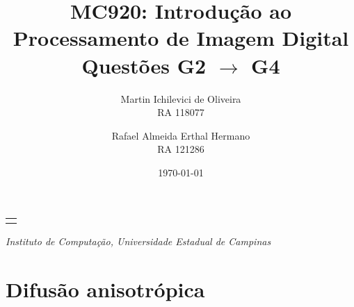 \documentclass[10pt,a4paper]{article}
\makeatletter
\let\@institution\empty
\def\institution#1{\def\@institution{#1}}
\renewcommand{\maketitle}{
    \begin{center}
        {\Large\bfseries\@title\par\medskip}
        {\large
            \begin{tabular}[t]{c}%
                \@author
        \end{tabular}\par\medskip}
        {\itshape\@institution\par}
        {\itshape\@date\par}
\end{center}}
\makeatother
\begin{document}

\title{MC920: Introdução ao Processamento de Imagem Digital\\Questões G2 $\rightarrow$ G4}
\author{
    \begin{minipage}{6cm}
        \centering
        Martin Ichilevici de Oliveira\\
        RA 118077
    \end{minipage}
    \and
    \begin{minipage}{6cm}
        \centering
        Rafael Almeida Erthal Hermano\\
        RA 121286
    \end{minipage}
}
\institution{Instituto de Computação, Universidade Estadual de Campinas}
\date{\today}

\newcommand{\itemm}[1]{\item \textbf{#1}}

\maketitle


\section{Difusão anisotrópica}
\end{document}

